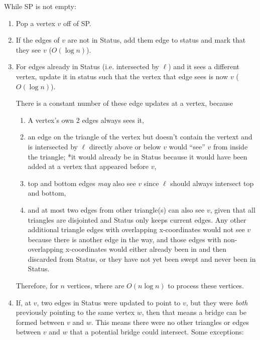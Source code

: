 \documentclass [12pt]{article}
\begin{document}
        While SP is not empty:
        \begin{enumerate}
            \item Pop a vertex $v$ off of SP. 
            \item If the edges of $v$ are not in Status, add them edge to status and mark that they see $v$ ($O(\log n)$). 
            \item For edges already in Status (i.e. intersected by $\ell$) and it sees a different vertex, update it in status such that the vertex that edge sees is now $v$ ($O(\log n)$). 
            
            There is a constant number of these edge updates at a vertex, because
            
            \begin{enumerate}
                \item  A vertex's own 2 edges always sees it,
                \item an edge on the triangle of the vertex but doesn't contain the vertext and is intersected by $\ell$ directly above or below $v$ would ``see'' $v$ from inside the triangle; *it would already be in Status because it would have been added at a vertex that appeared before $v$,
                \item top and bottom edges \emph{may} also see $v$ since $\ell$ should always intersect top and bottom, 
                \item and at most two edges from other triangle(s) can also see $v$, given that all triangles are disjointed and Status only keeps current edges. Any other additional triangle edges with overlapping x-coordinates would not see $v$ because there is another edge in the way, and those edges with non-overlapping x-coordinates would either already been in and then discarded from Status, or they have not yet been swept and never been in Status.
            \end{enumerate}

            Therefore, for $n$ vertices, where are $O(n\log n)$ to process these vertices.

            \item If, at $v$, two edges in Status were updated to point to $v$, but they were \emph{both} previously pointing to the same vertex $w$, then that means a bridge can be formed between $v$ and $w$. This means there were no other triangles or edges between $v$ and $w$ that a potential bridge could intersect. Some exceptions:
            

\end{enumerate}
\end{document}
